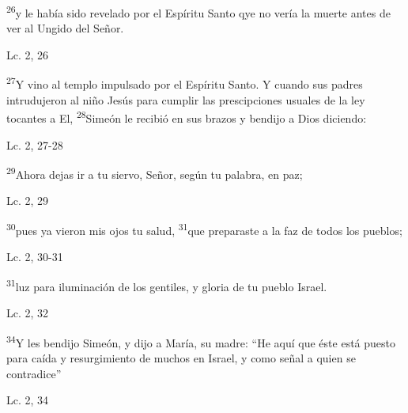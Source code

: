 \documentclass[a4paper,11pt]{article}
\begin{document}
      \begin{center}
        \textsuperscript{26}y le había sido revelado por el Espíritu Santo qye no vería la muerte antes de ver al Ungido del Señor.  
      \end{center}
      
      \begin{center}
        Lc. 2, 26       
      \end{center}
      
      \begin{center}
        \textsuperscript{27}Y vino al templo impulsado por el Espíritu Santo. Y cuando sus padres intrudujeron al niño Jesús para cumplir las prescipciones usuales
        de la ley tocantes a El, \textsuperscript{28}Simeón le recibió en sus brazos y bendijo a Dios diciendo:
      \end{center}
      \begin{center}
        Lc. 2, 27-28         
      \end{center}
      
      \begin{center}
        \textsuperscript{29}Ahora dejas ir a tu siervo, Señor, según tu palabra, en paz;
      \end{center}
      \begin{center}
        Lc. 2, 29        
      \end{center}

      \begin{center}
        \textsuperscript{30}pues ya vieron mis ojos tu salud, \textsuperscript{31}que preparaste a la faz de todos los pueblos;
      \end{center}
      \begin{center}
        Lc. 2, 30-31         
      \end{center}
      
      \begin{center}
        \textsuperscript{31}luz para iluminación de los gentiles, y gloria de tu pueblo Israel.
      \end{center}
      \begin{center}
        Lc. 2, 32        
      \end{center}
      
      \begin{center}
        \textsuperscript{34}Y les bendijo Simeón, y dijo a María, su madre: ``He aquí que éste está puesto para caída y resurgimiento de muchos en Israel, y como
         señal a quien se contradice''
      \end{center}
      \begin{center}
        Lc. 2, 34       
      \end{center}
      
\end{document}
